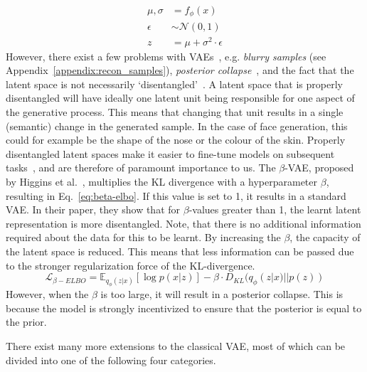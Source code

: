 \begin{equation}
    \begin{split}
        \mu, \sigma & = f_\phi(x)                     \\
        \epsilon    & \sim \mathcal{N}(0, 1)          \\
        z           & = \mu + \sigma^2 \cdot \epsilon
    \end{split}
    \label{eq:reparametrization-trick}
\end{equation}
However, there exist a few problems with VAEs~\cite{tomczak2021deep}, e.g. \emph{blurry samples} (see Appendix~\ref{appendix:recon_samples}), \emph{posterior collapse}~\cite{DBLP:journals/corr/BowmanVVDJB15}, and the fact that the latent space is not necessarily `disentangled'~\cite{higgins2017betavae}. A latent space that is properly disentangled will have ideally one latent unit being responsible for one aspect of the generative process. This means that changing that unit results in a single (semantic) change in the generated sample. In the case of face generation, this could for example be the shape of the nose or the colour of the skin. Properly disentangled latent spaces make it easier to fine-tune models on subsequent tasks~\cite{bengio2014representationlearningreviewnew}, and are therefore of paramount importance to us. The $\beta$-VAE, proposed by Higgins et al.~\cite{higgins2017betavae}, multiplies the KL divergence with a hyperparameter $\beta$, resulting in Eq.~\ref{eq:beta-elbo}. If this value is set to 1, it results in a standard VAE. In their paper, they show that for $\beta$-values greater than 1, the learnt latent representation is more disentangled. Note, that there is no additional information required about the data for this to be learnt. By increasing the $\beta$, the capacity of the latent space is reduced. This means that less information can be passed due to the stronger regularization force of the KL-divergence.
\begin{equation}
    \mathcal{L}_{\beta-ELBO} = \mathbb{E}_{q_{\phi}(z|x)}[\log p(x|z)] - \beta \cdot D_{KL}(q_{\phi}(z|x) || p(z))
    \label{eq:beta-elbo}
\end{equation}
However, when the $\beta$ is too large, it will result in a posterior collapse. This is because the model is strongly incentivized to ensure that the posterior is equal to the prior.

There exist many more extensions to the classical VAE, most of which can be divided into one of the following four categories.

